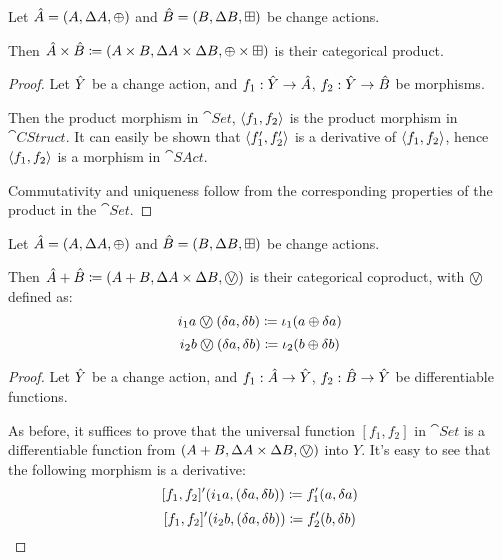 \begin{prop}[Products]
  Let $\hat{A} = (A,\Delta A,\oplus)$ and $\hat{B} =
  (B,\Delta B,\boxplus)$ be change actions.

  Then $\hat{A} \times \hat{B} \coloneqq (A \times B,\Delta A \times
  \Delta B,\oplus \times \boxplus)$ is their categorical product.
\end{prop}
\ifproofs
\begin{proof}
  Let $\hat{Y}$ be a change action, and $f_1: \hat{Y} \rightarrow \hat{A}$, $f_2: \hat{Y}
  \rightarrow \hat{B}$ be morphisms.

  Then the product morphism in $\cat{Set}$, $\left\langle {f_1}, {f_2} \right\rangle$ is the product
  morphism in $\cat{CStruct}$. It can easily be
  shown that $\left\langle {f_1'}, {f_2'} \right\rangle$ is a derivative of $\left\langle {f_1}, {f_2} \right\rangle$,
  hence $\left\langle {f_1}, {f_2} \right\rangle$ is a morphism in $\cat{SAct}$.

  Commutativity and uniqueness follow from the corresponding properties of the
  product in the $\cat{Set}$.
\end{proof}
\fi

\begin{prop}[Coproducts]
  Let $\hat{A} = (A,\Delta A,\oplus)$ and $\hat{B} =
  (B,\Delta B,\boxplus)$ be change actions.

  Then $\cstr{A} + \cstr{B} \defeq \cstruct{A + B}{\changes{A} \times
  \changes{B}}{\cplusvee}$ is their categorical coproduct, with $\cplusvee$ defined as:
  $$i_1 a \cplusvee (\change{a}, \change{b}) \defeq \iota_1 (a \cplus \change{a})$$
  $$i_2 b \cplusvee (\change{a}, \change{b}) \defeq \iota_2 (b \cplus \change{b})$$
\end{prop}
\ifproofs
\begin{proof}
  Let $\hat{Y}$ be a change action, and $f_1 : \hat{A} \rightarrow \hat{Y}$, $f_2 : \hat{B}
  \rightarrow \hat{Y}$ be differentiable functions.

  As before, it suffices to prove that the universal function $[f_1, f_2]$ in $\cat{Set}$ is a differentiable
  function from $\cstruct{A + B}{\changes{A} \times \changes{B}}{\cplusvee}$ into $Y$. It's easy to see 
  that the following morphism is a derivative:
  $$[f_1, f_2]' (i_1 a, (\delta a, \delta b)) \coloneqq f_1'(a, \delta a)$$
  $$[f_1, f_2]' (i_2 b, (\delta a, \delta b)) \coloneqq f_2'(b, \delta b)$$
\end{proof}
\fi


